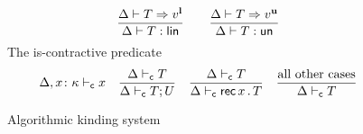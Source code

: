 \begin{figure}[h!]
  \begin{equation*}
    \frac{
      \algkindout T {v^\Lin}
    }{
      \isLin T
    }
    \qquad
    \frac{
      \algkindout T {v^\Un}
    }{
      \isUn T
    }
  \end{equation*}
  The is-contractive predicate \hfill{}
  \begin{equation*}
    \isContractive[\kindEnv,x\colon\kind]{x}
    \quad 
    \frac{
      \isContractive{T}
    }{
      \isContractive{T;U}
    }
    \quad
    \frac{
      \isContractive{T}
    }{
      \isContractive{\tRecK xT}
    }
    \quad
    \frac{\text{all other cases}}{\isContractive{T}}
  \end{equation*}
  \caption{Algorithmic kinding system}
  \label{fig:kinding-system}
\end{figure}

